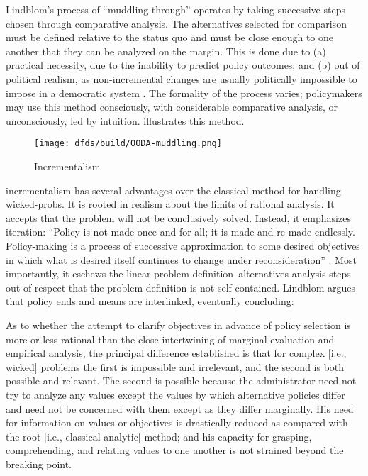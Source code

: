 Lindblom's process of ``\ac{muddling-through}'' operates by taking successive steps chosen through comparative analysis.
The alternatives selected for comparison must be defined relative to the status quo and must be close enough to one
another that they can be analyzed on the margin. This is done due to (a) practical necessity, due to the inability to
predict policy outcomes, and (b) out of political realism, as non-incremental changes are usually politically impossible
to impose in a democratic system \cite{lindblom_muddling_1959}. The formality of the process varies; policymakers may
use this method consciously, with considerable comparative analysis, or unconsciously, led by intuition.
 illustrates this method.


\begin{figure}[h]
  \centering\CaptionFontSize
  \texttt{[image: dfds/build/OODA-muddling.png]}
  \caption{Incrementalism}
  \label{fig-muddling-through}
\end{figure}

\Ac{incrementalism} has several advantages over the \ac{classical-method} for handling \acp{wicked-prob}. It is rooted
in realism about the limits of rational analysis. It accepts that the problem will not be conclusively solved. Instead,
it emphasizes iteration: ``Policy is not made once and for all; it is made and re-made endlessly. Policy-making is a
process of successive approximation to some desired objectives in which what is desired itself continues to change under
reconsideration'' \cite{lindblom_muddling_1959}. Most importantly, it eschews the linear
problem-definition--alternatives-analysis steps out of respect that the problem definition is not self-contained.
Lindblom argues that policy ends and means are interlinked, eventually concluding:

\begin{displayquote}
As to whether the attempt to clarify objectives in advance of policy selection is more or less rational than the close
intertwining of marginal evaluation and empirical analysis, the principal difference established is that for complex
[i.e., wicked] problems the first is impossible and irrelevant, and the second is both possible and relevant. The second
is possible because the administrator need not try to analyze any values except the values by which alternative policies
differ and need not be concerned with them except as they differ marginally. His need for information on values or
objectives is drastically reduced as compared with the root [i.e., classical analytic] method; and his capacity for
grasping, comprehending, and relating values to one another is not strained beyond the breaking point.
\cite{lindblom_muddling_1959}
\end{displayquote}

